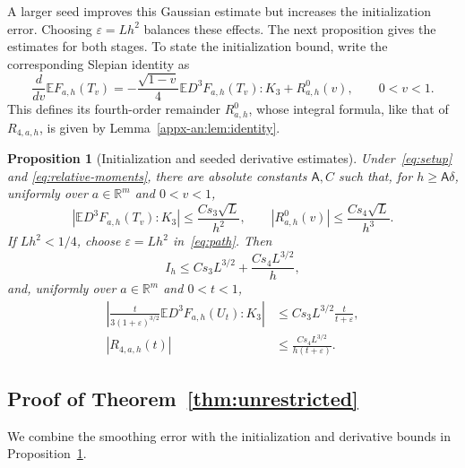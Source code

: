 \documentclass[11pt,letterpaper]{article}
\newtheorem{proposition}{Proposition}
\theoremstyle{remark}
\newcommand{\E}{\mathbb E}
\newcommand{\R}{\mathbb R}
\begin{document}
A larger seed improves this Gaussian estimate but increases the
initialization error. Choosing \(\varepsilon=Lh^2\) balances these
effects. The next proposition gives the estimates for both stages.
To state the initialization bound, write the corresponding Slepian
identity as
\[
 \frac{d}{dv}\E F_{a,h}(T_v)
 =-\frac{\sqrt{1-v}}4\E D^3F_{a,h}(T_v):K_3+R^0_{a,h}(v),
 \qquad 0<v<1.
\]
This defines its fourth-order remainder \(R^0_{a,h}\), whose integral
formula, like that of \(R_{4,a,h}\), is given by
Lemma~\ref{appx-an:lem:identity}.

\begin{proposition}[Initialization and seeded derivative estimates]
\label{an:prop:derivative}
Under~\eqref{eq:setup} and \eqref{eq:relative-moments}, there are absolute constants \(\mathsf A,C\)
such that, for \(h\ge\mathsf A\delta\), uniformly over
\(a\in\R^m\) and \(0<v<1\),
\begin{equation}
 |\E D^3F_{a,h}(T_v):K_3|\le\frac{Cs_3\sqrt L}{h^2},
 \qquad |R^0_{a,h}(v)|\le\frac{Cs_4\sqrt L}{h^3}.
 \label{eq:direct-initialization}
\end{equation}
If \(Lh^2<1/4\), choose \(\varepsilon=Lh^2\) in~\eqref{eq:path}.
Then
\begin{equation}
 I_h\le Cs_3 L^{3/2}+\frac{Cs_4L^{3/2}}h,
 \label{eq:initialization-bound}
\end{equation}
and, uniformly over \(a\in\R^m\) and \(0<t<1\),
\begin{equation}
 \begin{aligned}
 \left|\frac{t}{3(1+\varepsilon)^{3/2}}
          \E D^3F_{a,h}(U_t):K_3\right|
 &\le Cs_3 L^{3/2}\frac{t}{t+\varepsilon},\\
 |R_{4,a,h}(t)|&\le\frac{Cs_4L^{3/2}}{h(t+\varepsilon)}.
 \end{aligned}
 \label{eq:seeded-derivatives}
\end{equation}

\end{proposition}
\subsection{Proof of Theorem~\ref*{thm:unrestricted}}\label{sec:proof-theorem-one}

We combine the smoothing error with the initialization and derivative
bounds in Proposition~\ref{an:prop:derivative}.
\end{document}
